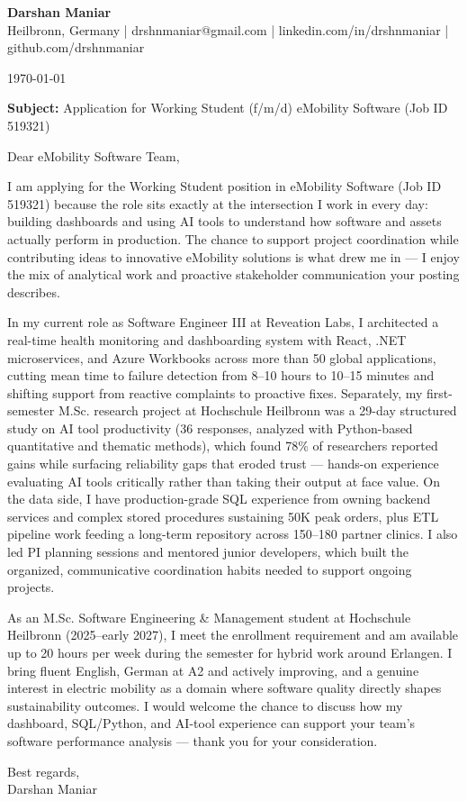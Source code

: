 \documentclass[letterpaper,11pt]{article}
\begin{document}
\begin{center}
{\Large \bfseries Darshan Maniar} \\ \vspace{2pt}
{\small Heilbronn, Germany | drshnmaniar@gmail.com | linkedin.com/in/drshnmaniar | github.com/drshnmaniar}
\end{center}
\begin{flushright}
{\small \today}
\end{flushright}


{\small \textbf{Subject:} Application for Working Student (f/m/d) eMobility Software (Job ID 519321)}


{\small Dear eMobility Software Team,}


{\small I am applying for the Working Student position in eMobility Software (Job ID 519321) because the role sits exactly at the intersection I work in every day: building dashboards and using AI tools to understand how software and assets actually perform in production. The chance to support project coordination while contributing ideas to innovative eMobility solutions is what drew me in — I enjoy the mix of analytical work and proactive stakeholder communication your posting describes.}


{\small In my current role as Software Engineer III at Reveation Labs, I architected a real-time health monitoring and dashboarding system with React, .NET microservices, and Azure Workbooks across more than 50 global applications, cutting mean time to failure detection from 8–10 hours to 10–15 minutes and shifting support from reactive complaints to proactive fixes. Separately, my first-semester M.Sc. research project at Hochschule Heilbronn was a 29-day structured study on AI tool productivity (36 responses, analyzed with Python-based quantitative and thematic methods), which found 78\% of researchers reported gains while surfacing reliability gaps that eroded trust — hands-on experience evaluating AI tools critically rather than taking their output at face value. On the data side, I have production-grade SQL experience from owning backend services and complex stored procedures sustaining 50K peak orders, plus ETL pipeline work feeding a long-term repository across 150–180 partner clinics. I also led PI planning sessions and mentored junior developers, which built the organized, communicative coordination habits needed to support ongoing projects.}


{\small As an M.Sc. Software Engineering \& Management student at Hochschule Heilbronn (2025–early 2027), I meet the enrollment requirement and am available up to 20 hours per week during the semester for hybrid work around Erlangen. I bring fluent English, German at A2 and actively improving, and a genuine interest in electric mobility as a domain where software quality directly shapes sustainability outcomes. I would welcome the chance to discuss how my dashboard, SQL/Python, and AI-tool experience can support your team's software performance analysis — thank you for your consideration.}



\vspace{6pt}
{\small Best regards,\\}
{\small Darshan Maniar}
\end{document}
